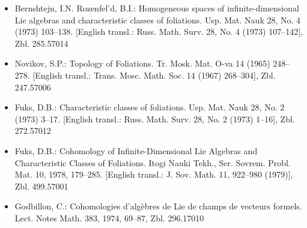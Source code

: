 \begin{itemize}
\item Bernshtejn, I.N. Rozenfel'd, B.I.: Homogeneous spaces of infinite-dimensional Lie algebras and characteristic classes of foliations. Usp. Mat. Nauk 28, No. 4 (1973) 103--138. [English transl.: Russ. Math. Surv. 28, No. 4 (1973) 107--142], Zbl. 285.57014
\item Novikov, S.P.: Topology of Foliations. Tr. Mosk. Mat. O-va 14 (1965) 248--278. [English transl.: Trans. Mosc. Math. Soc. 14 (1967) 268--304], Zbl. 247.57006
\item Fuks, D.B.: Characteristic classes of foliations. Usp. Mat. Nauk 28, No. 2 (1973) 3--17. [English transl.: Russ. Math. Surv. 28, No. 2 (1973) 1--16], Zbl. 272.57012
\item Fuks, D.B.: Cohomology of Infinite-Dimensional Lie Algebras and Characteristic Classes of Foliations. Itogi Nauki Tekh., Ser. Sovrem. Probl. Mat. 10, 1978, 179--285. [English transl.: J. Sov. Math. 11, 922--980 (1979)], Zbl. 499.57001
\item Godbillon, C.: Cohomologies d'algèbres de Lie de champs de vecteurs formels. Lect. Notes Math. 383, 1974, 69--87, Zbl. 296.17010
\end{itemize}


